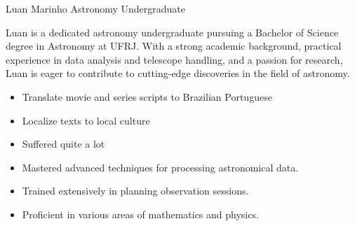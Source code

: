 \documentclass{article}
\begin{document}
\begin{cv}[avatar]{Luan Marinho }{Astronomy Undergraduate}


 Luan is a dedicated astronomy undergraduate pursuing a Bachelor of Science degree in Astronomy at UFRJ. With a strong academic background, practical experience in data analysis and telescope handling, and a passion for research, Luan is eager to contribute to cutting-edge discoveries in the field of astronomy.



\begin{cvevent}[present][2022]
    \begin{itemize}
        \item Translate movie and series scripts to Brazilian Portuguese 
        \item Localize texts to local culture
    \end{itemize}
\end{cvevent}


\begin{cvevent}[present][2022]
    \begin{itemize}
        \item Suffered quite a lot
    \end{itemize}
\end{cvevent}

\begin{cvevent}[present][2022]
    \begin{itemize}
        \item Mastered advanced techniques for processing astronomical data.
        \item Trained extensively in planning observation sessions.
        \item Proficient in various areas of mathematics and physics.
    \end{itemize}
\end{cvevent}





\end{cv}
\end{document}

